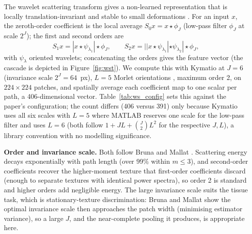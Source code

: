 The wavelet scattering transform gives a non-learned representation that is locally translation-invariant and stable to small deformations \cite{mallat2012invariant, bruna2013invariant}. For an input $x$, the zeroth-order coefficient is the local average $S_0 x = x \star \phi_J$ (low-pass filter $\phi_J$ at scale $2^J$); the first and second orders are
\[
S_1 x = |x \star \psi_{\lambda_1}| \star \phi_J, \qquad
S_2 x = ||x \star \psi_{\lambda_1}| \star \psi_{\lambda_2}| \star \phi_J,
\]
with $\psi_{\lambda}$ oriented wavelets; concatenating the orders gives the feature vector (the cascade is depicted in Figure~\ref{fig:wst}). We compute this with Kymatio \cite{andreux2020kymatio} at $J=6$ (invariance scale $2^J=64$~px), $L=5$ Morlet orientations \cite{morlet1982wave}, maximum order 2, on $224 \times 224$ patches, and spatially average each coefficient map to one scalar per path, a 406-dimensional vector. Table~\ref{tab:ws_config} sets this against the paper's configuration; the count differs (406 versus 391) only because Kymatio uses all six scales with $L=5$ where MATLAB reserves one scale for the low-pass filter and uses $L=6$ (both follow $1 + JL + \binom{J}{2} L^2$ for the respective $J,L$), a library convention with no modelling significance.

\textbf{Order and invariance scale.} Both follow Bruna and Mallat \cite{bruna2013invariant}. Scattering energy decays exponentially with path length (over 99\% within $m\le3$), and second-order coefficients recover the higher-moment texture that first-order coefficients discard (enough to separate textures with identical power spectra), so order 2 is standard and higher orders add negligible energy. The large invariance scale suits the tissue task, which is stationary-texture discrimination: Bruna and Mallat show the optimal invariance scale then approaches the patch width (minimising estimator variance), so a large $J$, and the near-complete pooling it produces, is appropriate here.

